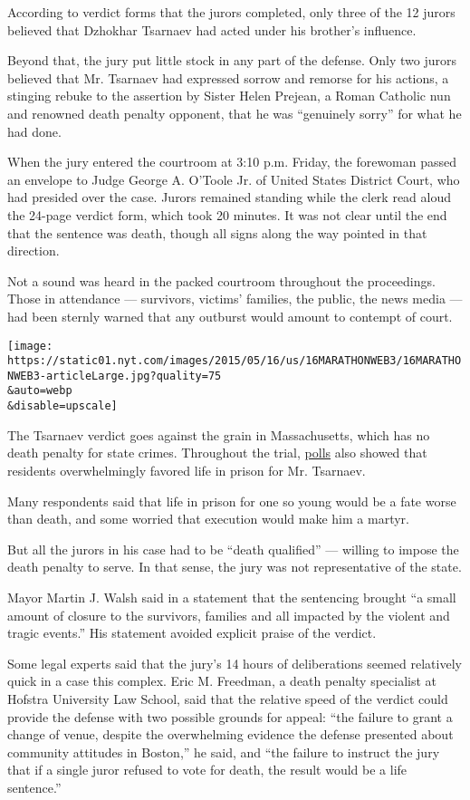 According to verdict forms that the jurors completed, only three of the
12 jurors believed that Dzhokhar Tsarnaev had acted under his brother's
influence.

Beyond that, the jury put little stock in any part of the defense. Only
two jurors believed that Mr. Tsarnaev had expressed sorrow and remorse
for his actions, a stinging rebuke to the assertion by Sister Helen
Prejean, a Roman Catholic nun and renowned death penalty opponent, that
he was ``genuinely sorry'' for what he had done.

When the jury entered the courtroom at 3:10 p.m. Friday, the forewoman
passed an envelope to Judge George A. O'Toole Jr. of United States
District Court, who had presided over the case. Jurors remained standing
while the clerk read aloud the 24-page verdict form, which took 20
minutes. It was not clear until the end that the sentence was death,
though all signs along the way pointed in that direction.

Not a sound was heard in the packed courtroom throughout the
proceedings. Those in attendance --- survivors, victims' families, the
public, the news media --- had been sternly warned that any outburst
would amount to contempt of court.

\texttt{[image: https://static01.nyt.com/images/2015/05/16/us/16MARATHONWEB3/16MARATHONWEB3-articleLarge.jpg?quality=75\\\&auto=webp\\\&disable=upscale]}

The Tsarnaev verdict goes against the grain in Massachusetts, which has
no death penalty for state crimes. Throughout the trial,
\href{http://www.nytimes.com/2015/03/24/us/most-boston-residents-prefer-life-term-over-death-penalty-in-marathon-case-poll-shows.html}{polls}
also showed that residents overwhelmingly favored life in prison for Mr.
Tsarnaev.

Many respondents said that life in prison for one so young would be a
fate worse than death, and some worried that execution would make him a
martyr.

But all the jurors in his case had to be ``death qualified'' --- willing
to impose the death penalty to serve. In that sense, the jury was not
representative of the state.

Mayor Martin J. Walsh said in a statement that the sentencing brought
``a small amount of closure to the survivors, families and all impacted
by the violent and tragic events.'' His statement avoided explicit
praise of the verdict.

Some legal experts said that the jury's 14 hours of deliberations seemed
relatively quick in a case this complex. Eric M. Freedman, a death
penalty specialist at Hofstra University Law School, said that the
relative speed of the verdict could provide the defense with two
possible grounds for appeal: ``the failure to grant a change of venue,
despite the overwhelming evidence the defense presented about community
attitudes in Boston,'' he said, and ``the failure to instruct the jury
that if a single juror refused to vote for death, the result would be a
life sentence.''

